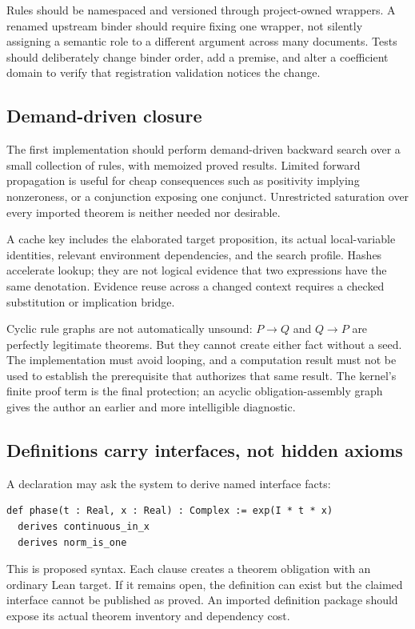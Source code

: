 \documentclass[11pt,letterpaper]{article}
\theoremstyle{definition}\newtheorem{definition}[theorem]{Definition}
\newcommand{\code}[1]{\texttt{\detokenize{#1}}}
\begin{document}
Rules should be namespaced and versioned through project-owned wrappers. A renamed upstream binder should require fixing one wrapper, not silently assigning a semantic role to a different argument across many documents. Tests should deliberately change binder order, add a premise, and alter a coefficient domain to verify that registration validation notices the change.

\subsection{Demand-driven closure}
The first implementation should perform demand-driven backward search over a small collection of rules, with memoized proved results. Limited forward propagation is useful for cheap consequences such as positivity implying nonzeroness, or a conjunction exposing one conjunct. Unrestricted saturation over every imported theorem is neither needed nor desirable.

A cache key includes the elaborated target proposition, its actual local-variable identities, relevant environment dependencies, and the search profile. Hashes accelerate lookup; they are not logical evidence that two expressions have the same denotation. Evidence reuse across a changed context requires a checked substitution or implication bridge.

Cyclic rule graphs are not automatically unsound: $P\to Q$ and $Q\to P$ are perfectly legitimate theorems. But they cannot create either fact without a seed. The implementation must avoid looping, and a computation result must not be used to establish the prerequisite that authorizes that same result. The kernel's finite proof term is the final protection; an acyclic obligation-assembly graph gives the author an earlier and more intelligible diagnostic.

\subsection{Definitions carry interfaces, not hidden axioms}
A declaration may ask the system to derive named interface facts:
\begin{lstlisting}
def phase(t : Real, x : Real) : Complex := exp(I * t * x)
  derives continuous_in_x
  derives norm_is_one
\end{lstlisting}
This is proposed syntax. Each \code{derives} clause creates a theorem obligation with an ordinary Lean target. If it remains open, the definition can exist but the claimed interface cannot be published as proved. An imported definition package should expose its actual theorem inventory and dependency cost.
\end{document}
